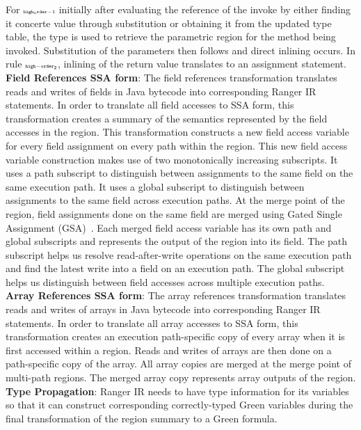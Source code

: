 For $\scriptscriptstyle\mathtt{high_order-1}$ initially after evaluating the reference of the invoke by either finding it concerte value through substitution or obtaining it from the updated type table, the type is used to retrieve the parametric region for the method being invoked. Substitution of the parameters then follows and direct inlining occurs. In rule $\scriptscriptstyle\mathtt{high-order_2}$, inlining of the return value translates to an assignment statement.
\\
\textbf{Field References SSA form}: The field references transformation translates reads and writes of fields
in Java bytecode into corresponding Ranger IR statements.
%
In order to translate all field accesses to SSA form, this transformation creates a summary of the semantics
represented by the field accesses in the region.
%
This transformation constructs a new field access variable for every field assignment on every path within the region.
%
This new field access variable construction makes use of two monotonically increasing subscripts.
%
It uses a path subscript to distinguish between assignments to the same field on the same execution path.
%
It uses a global subscript to distinguish between assignments to the same field across execution paths.
%
At the merge point of the region, field assignments done on the same field are merged using
Gated Single Assignment (GSA)~\cite{Ottenstein1990}.
%
Each merged field access variable has its own path and global subscripts and represents the output of the region into
its field.
%
The path subscript helps us resolve read-after-write operations on the same execution path and find the latest write
into a field on an execution path.
%
The global subscript helps us distinguish between field accesses across multiple execution paths. \\
\textbf{Array References SSA form}: The array references transformation translates reads and writes of arrays in
Java bytecode into corresponding Ranger IR statements.
%
In order to translate all array accesses to SSA form, this transformation creates an execution path-specific copy of
every array when it is first accessed within a region.
%
Reads and writes of arrays are then done on a path-specific copy of the array.
%
All array copies are merged at the merge point of multi-path regions.
%
The merged array copy represents array outputs of the region.\\
\textbf{Type Propagation}: Ranger IR needs to have type information for its variables so that it can construct
corresponding correctly-typed Green variables during the final transformation of the region summary to a Green formula.
